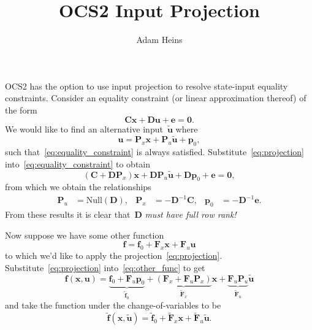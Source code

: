 \documentclass{article}
\title{OCS2 Input Projection}
\author{Adam Heins}
\begin{document}
\maketitle

OCS2 has the option to use input projection to resolve state-input equality
constraints. Consider an equality constraint (or linear approximation thereof)
of the form
\begin{equation}\label{eq:equality_constraint}
  \bm{C}\bm{x} + \bm{D}\bm{u} + \bm{e} = \bm{0}.
\end{equation}
We would like to find an alternative input~$\tilde{\bm{u}}$ where
\begin{equation}\label{eq:projection}
  \bm{u} = \bm{P}_x\bm{x}+\bm{P}_u\tilde{\bm{u}} + \bm{p}_0,
\end{equation}
such that~\eqref{eq:equality_constraint} is always satisfied.
Substitute~\eqref{eq:projection} into~\eqref{eq:equality_constraint} to obtain
\begin{equation*}
  (\bm{C}+\bm{D}\bm{P}_x)\bm{x} + \bm{D}\bm{P}_u\tilde{\bm{u}} + \bm{D}\bm{p}_0 + \bm{e} = \bm{0},
\end{equation*}
from which we obtain the relationships
\begin{align*}
  \bm{P}_u &= \mathrm{Null}(\bm{D}), & \bm{P}_x &= -\bm{D}^{-1}\bm{C}, & \bm{p}_0 &= -\bm{D}^{-1}\bm{e}.
\end{align*}
From these results it is clear that~$\bm{D}$ \emph{must have full row rank!}

Now suppose we have some other function
\begin{equation}\label{eq:other_func}
  \bm{f} = \bm{f}_0 + \bm{F}_x\bm{x} + \bm{F}_u\bm{u}
\end{equation}
to which we'd like to apply the projection~\eqref{eq:projection}.
Substitute~\eqref{eq:projection} into~\eqref{eq:other_func} to get
\begin{equation*}
  \bm{f}(\bm{x},\bm{u}) = \underbrace{\bm{f}_0 + \bm{F}_u\bm{p}_0}_{\tilde{\bm{f}}_0} + \underbrace{(\bm{F}_x + \bm{F}_u\bm{P}_x)}_{\tilde{\bm{F}}_x}\bm{x} + \underbrace{\bm{F}_u\bm{P}_u}_{\tilde{\bm{F}}_u}\tilde{\bm{u}}
\end{equation*}
and take the function under the change-of-variables to be
\begin{equation*}
  \tilde{\bm{f}}(\bm{x},\tilde{\bm{u}}) = \tilde{\bm{f}}_0 + \tilde{\bm{F}}_x\bm{x} + \tilde{\bm{F}}_u\tilde{\bm{u}}.
\end{equation*}
\end{document}
